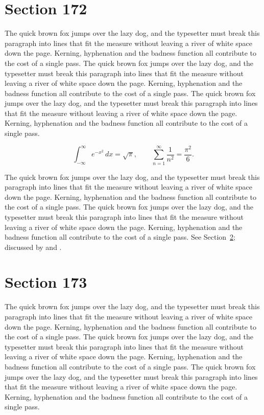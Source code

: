 \documentclass{article}
\begin{document}
\section{Section 172}
\label{sec:172}
The quick brown fox jumps over the lazy dog, and the typesetter must break this paragraph into lines that fit the measure without leaving a river of white space down the page. Kerning, hyphenation and the badness function all contribute to the cost of a single pass. The quick brown fox jumps over the lazy dog, and the typesetter must break this paragraph into lines that fit the measure without leaving a river of white space down the page. Kerning, hyphenation and the badness function all contribute to the cost of a single pass. The quick brown fox jumps over the lazy dog, and the typesetter must break this paragraph into lines that fit the measure without leaving a river of white space down the page. Kerning, hyphenation and the badness function all contribute to the cost of a single pass. 

\begin{equation}\label{eq:172}
\int_{-\infty}^{\infty} e^{-x^{2}}\,dx = \sqrt{\pi}, \qquad
\sum_{n=1}^{\infty} \frac{1}{n^{2}} = \frac{\pi^{2}}{6}.
\end{equation}

The quick brown fox jumps over the lazy dog, and the typesetter must break this paragraph into lines that fit the measure without leaving a river of white space down the page. Kerning, hyphenation and the badness function all contribute to the cost of a single pass. The quick brown fox jumps over the lazy dog, and the typesetter must break this paragraph into lines that fit the measure without leaving a river of white space down the page. Kerning, hyphenation and the badness function all contribute to the cost of a single pass. 
See Section~\ref{sec:173}; discussed by \textcite{k3} and \textcite{l5}.
\section{Section 173}
\label{sec:173}
The quick brown fox jumps over the lazy dog, and the typesetter must break this paragraph into lines that fit the measure without leaving a river of white space down the page. Kerning, hyphenation and the badness function all contribute to the cost of a single pass. The quick brown fox jumps over the lazy dog, and the typesetter must break this paragraph into lines that fit the measure without leaving a river of white space down the page. Kerning, hyphenation and the badness function all contribute to the cost of a single pass. The quick brown fox jumps over the lazy dog, and the typesetter must break this paragraph into lines that fit the measure without leaving a river of white space down the page. Kerning, hyphenation and the badness function all contribute to the cost of a single pass. 
\end{document}
